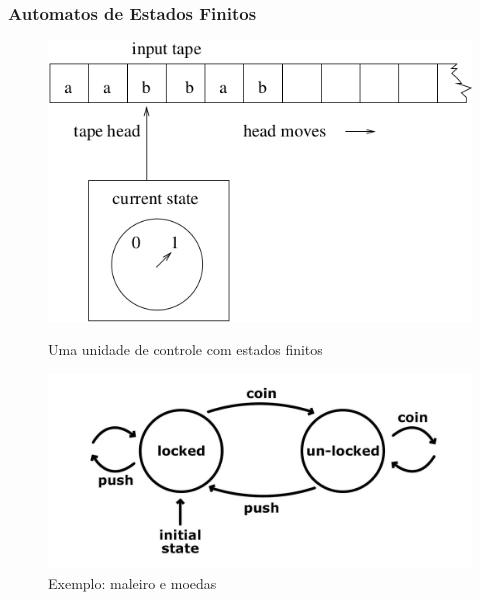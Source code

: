 \documentclass[10pt]{beamer}
\begin{document}
\begin{frame}[fragile]
\frametitle{Automatos de Estados Finitos}
\begin{figure}[!ht]
	\centering
	
\begin{minipage}[b]{0.475\linewidth}
	\centering
	\includegraphics[width=\textwidth, height =.4\textheight]
{figuras/afd_elementos.png}
		\caption{Uma unidade de controle com estados finitos}
\end{minipage}
\hspace{0.2cm}
\begin{minipage}[b]{0.475\linewidth}
	\centering
	\includegraphics[width=\textwidth, height =.4\textheight]{maq_moedas.jpg}
	\caption{Exemplo: maleiro e moedas}
\end{minipage}
\end{figure}


\end{frame}
\end{document}
